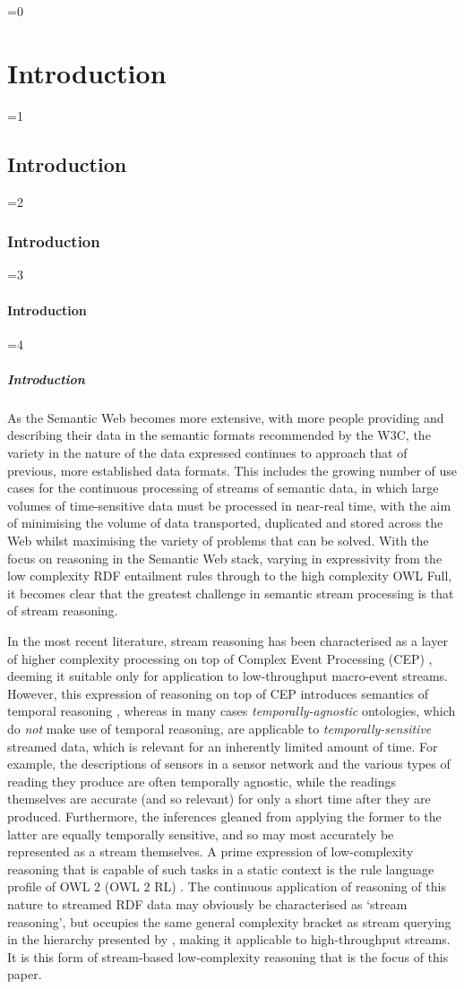 \documentclass[twocolumn,preprint,3p,number]{elsarticle}
\theoremstyle{plain}
\theoremstyle{definition}
\newcounter{nestingdepth}
\newenvironment{nestedsection}[2]{
  \ifnum\value{nestingdepth}=0
    \chapter{#1}
  \else
    \ifnum\value{nestingdepth}=1
      \section{#1}
    \else
      \ifnum\value{nestingdepth}=2
        \subsection{#1}
      \else
        \ifnum\value{nestingdepth}=3
          \subsubsection{#1}
        \else
          \ifnum\value{nestingdepth}=4
            \paragraph{#1}
          \else
            \PackageError{nestedsections}{Maximum nesting level exceeded!}{uh oh!}
          \fi
        \fi
      \fi
    \fi
  \fi
  \addtocounter{nestingdepth}{1}
  \label{sec:#2}
}{\addtocounter{nestingdepth}{-1}}
\begin{document}
\begin{nestedsection}{Introduction}{intro}
  As the Semantic Web becomes more extensive, with more people providing and describing their data in the semantic formats recommended by the W3C, the variety in the nature of the data expressed continues to approach that of previous, more established data formats.
  This includes the growing number of use cases for the continuous processing of streams of semantic data, in which large volumes of time-sensitive data must be processed in near-real time, with the aim of minimising the volume of data transported, duplicated and stored across the Web whilst maximising the variety of problems that can be solved.
  With the focus on reasoning in the Semantic Web stack, varying in expressivity from the low complexity RDF entailment rules through to the high complexity OWL Full, it becomes clear that the greatest challenge in semantic stream processing is that of stream reasoning.

  In the most recent literature, stream reasoning has been characterised as a layer of higher complexity processing on top of Complex Event Processing (CEP) \citep{mileo15webSR}, deeming it suitable only for application to low-throughput macro-event streams.
  However, this expression of reasoning on top of CEP introduces semantics of temporal reasoning \citep{OrgunWadge92,Tuzhilin93}, whereas in many cases \emph{temporally-agnostic} ontologies, which do \emph{not} make use of temporal reasoning, are applicable to \emph{temporally-sensitive} streamed data, which is relevant for an inherently limited amount of time.
  For example, the descriptions of sensors in a sensor network and the various types of reading they produce are often temporally agnostic, while the readings themselves are accurate (and so relevant) for only a short time after they are produced.
  Furthermore, the inferences gleaned from applying the former to the latter are equally temporally sensitive, and so may most accurately be represented as a stream themselves.
  A prime expression of low-complexity reasoning that is capable of such tasks in a static context is the rule language profile of OWL 2 (OWL 2 RL) \citep{w3cowl2profiles}.
  The continuous application of reasoning of this nature to streamed RDF data may obviously be characterised as `stream reasoning', but occupies the same general complexity bracket as stream querying in the hierarchy presented by \citep{mileo15webSR}, making it applicable to high-throughput streams.
  It is this form of stream-based low-complexity reasoning that is the focus of this paper.


\end{nestedsection}
\end{document}
